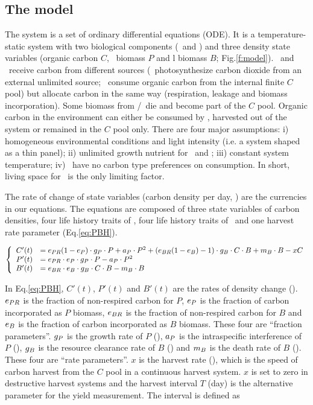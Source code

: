 \documentclass[env.tex]{subfiles}
\begin{document}
\subsection{The model}
The system is a set of ordinary differential equations (ODE).  It is a temperature-static system with two biological components (\phy\ and \bac) and three density state variables (organic carbon $C$, \phy\ biomass $P$ and \bac l biomass $B$; Fig.\ref{f:model}). \Phy\ and \bac\ receive carbon from different sources (\phy\ photosynthesize carbon dioxide from an external unlimited source; \bac\ consume organic carbon from the internal finite $C$ pool) but allocate carbon in the same way (respiration, leakage and biomass incorporation).  Some biomass from \phy/\bac\ die and become part of the $C$ pool.  Organic carbon in the environment can either be consumed by \bac, harvested out of the system or remained in the $C$ pool only.  There are four major assumptions:  \Rn{1}) homogeneous environmental conditions and light intensity (i.e. a system shaped as a thin panel); \Rn{2}) unlimited growth nutrient for \phy\ and \bac; \Rn{3}) constant system temperature; \Rn{4}) \bac\ have no carbon type preferences on consumption.  In short, living space for \phy\ is the only limiting factor.

The rate of change of state variables (carbon density per day, \dxdt) are the currencies in our equations.  The equations are composed of three state variables of carbon densities, four life history traits of \phy, four life history traits of \bac\ and one harvest rate parameter (Eq.\ref{eq:PBH}).

\begin{equation}\left\{\begin{array}{rl}
    C'(t) &= e_{PR}(1-e_P)\cdot g_P\cdot P +a_P\cdot P^2 +(e_{BR}(1-e_B)-1)\cdot g_B\cdot C\cdot B +m_B\cdot B -xC\\
    P'(t) &= e_{PR}\cdot e_P\cdot g_P\cdot P -a_P\cdot P^2\\
    B'(t) &= e_{BR}\cdot e_B\cdot g_B\cdot C\cdot B -m_B\cdot B
\end{array}\right.\label{eq:PBH}\end{equation}

In Eq.\ref{eq:PBH}, $C'(t)$, $P'(t)$ and $B'(t)$ are the rates of density change (\dxdt).  $e_{PR}$ is the fraction of non-respired carbon for $P$, $e_P$ is the fraction of carbon incorporated as $P$ biomass, $e_{BR}$ is the fraction of non-respired carbon for $B$ and $e_B$ is the fraction of carbon incorporated as $B$ biomass.  These four are ``fraction parameters”.  $g_P$ is the growth rate of $P$ (\dayU), $a_P$ is the intraspecific interference of $P$ (\denI), $g_B$ is the resource clearance rate of $B$  (\denI) and $m_B$ is the death rate of $B$ (\dayU).  These four are ``rate parameters”.  $x$ is the harvest rate (\dayU), which is the speed of carbon harvest from the $C$ pool in a continuous harvest system.  $x$ is set to zero in destructive harvest systems and the harvest interval $T$ (day) is the alternative parameter for the yield measurement.  The interval is defined as
\end{document}
